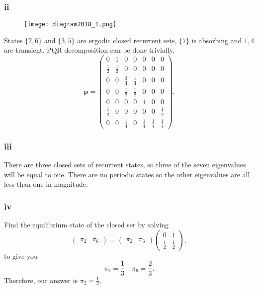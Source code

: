 \documentclass{article}
\begin{document}
\subsubsection{ii}
\begin{figure}[H]
    \centering
    \texttt{[image: diagram2018\_1.png]}
    \label{fig:1b}
\end{figure}
States $\{2,6\}$ and $\{3,5\}$ are ergodic closed recurrent sets, $\{7\}$ is absorbing and $1,4$ are transient. PQR decomposition can be done trivially.
\begin{equation}
    \mathbf{p} = \begin{pmatrix}
        0 & 1 & 0 & 0 & 0 & 0 & 0 \\
        \frac{1}{2} & \frac{1}{2} & 0 & 0 & 0 & 0 & 0 \\
        0 & 0 & \frac{3}{4} & \frac{1}{4} & 0 & 0 & 0 \\
        0 & 0 & \frac{1}{2} & \frac{1}{2} & 0 & 0 & 0 \\
        0 & 0 & 0 & 0 & 1 & 0 & 0 \\
        \frac{1}{2} & 0 & 0 & 0 & 0 & 0 & \frac{1}{2} \\
        0 & 0 & \frac{1}{4} & 0 & \frac{1}{4} & \frac{1}{4} & \frac{1}{4}
    \end{pmatrix}.\label{p_ii}
\end{equation}

\subsubsection{iii}
There are three closed sets of recurrent states, so three of the seven eigenvalues will be equal to one. There are no periodic states so the other eigenvalues are all less than one in magnitude.

\subsubsection{iv}
Find the equilibrium state of the closed set by solving
\begin{equation}
    \begin{pmatrix}
    \pi_2 & \pi_6
    \end{pmatrix} = \begin{pmatrix}
    \pi_2 & \pi_6
    \end{pmatrix}\begin{pmatrix}
    0 & 1 \\ \frac{1}{2} & \frac{1}{2}
    \end{pmatrix},
\end{equation}
to give you 
\begin{equation}
    \pi_2 = \frac{1}{3} \quad \pi_6 = \frac{2}{3}.
\end{equation}
Therefore, our answer is $\pi_2 = \frac{1}{3}$. 
\end{document}
